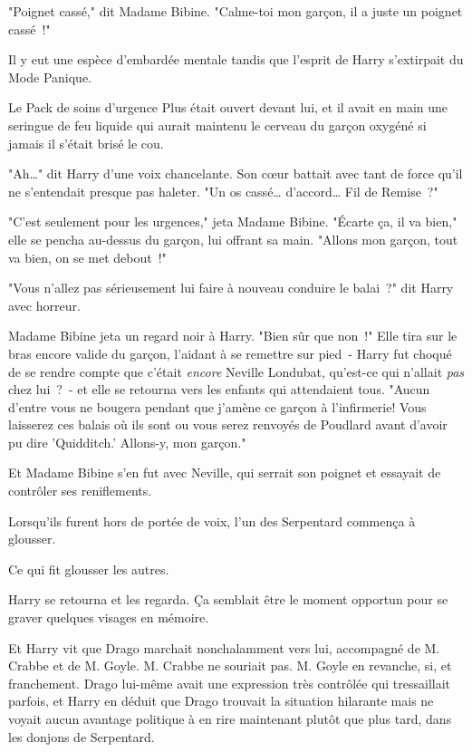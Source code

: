 "Poignet cassé," dit Madame Bibine. "Calme-toi mon garçon, il a juste un poignet cassé~!"

Il y eut une espèce d'embardée mentale tandis que l'esprit de Harry s'extirpait du Mode Panique.

Le Pack de soins d'urgence Plus était ouvert devant lui, et il avait en main une seringue de feu liquide qui aurait maintenu le cerveau du garçon oxygéné si jamais il s'était brisé le cou.

"Ah…" dit Harry d'une voix chancelante. Son cœur battait avec tant de force qu'il ne s'entendait presque pas haleter. "Un os cassé… d'accord… Fil de Remise~?"

"C'est seulement pour les urgences," jeta Madame Bibine. "Écarte ça, il va bien," elle se pencha au-dessus du garçon, lui offrant sa main. "Allons mon garçon, tout va bien, on se met debout~!"

"Vous n'allez pas sérieusement lui faire à nouveau conduire le balai~?" dit Harry avec horreur.

Madame Bibine jeta un regard noir à Harry. "Bien sûr que non~!" Elle tira sur le bras encore valide du garçon, l'aidant à se remettre sur pied~- Harry fut choqué de se rendre compte que c'était \emph{encore} Neville Londubat, qu'est-ce qui n'allait \emph{pas} chez lui~?~- et elle se retourna vers les enfants qui attendaient tous. "Aucun d'entre vous ne bougera pendant que j'amène ce garçon à l'infirmerie! Vous laisserez ces balais où ils sont ou vous serez renvoyés de Poudlard avant d'avoir pu dire 'Quidditch.' Allons-y, mon garçon."

Et Madame Bibine s'en fut avec Neville, qui serrait son poignet et essayait de contrôler ses reniflements.

Lorsqu'ils furent hors de portée de voix, l'un des Serpentard commença à glousser.

Ce qui fit glousser les autres.

Harry se retourna et les regarda. Ça semblait être le moment opportun pour se graver quelques visages en mémoire.

Et Harry vit que Drago marchait nonchalamment vers lui, accompagné de M. Crabbe et de M. Goyle. M. Crabbe ne souriait pas. M. Goyle en revanche, si, et franchement. Drago lui-même avait une expression très contrôlée qui tressaillait parfois, et Harry en déduit que Drago trouvait la situation hilarante mais ne voyait aucun avantage politique à en rire maintenant plutôt que plus tard, dans les donjons de Serpentard.

